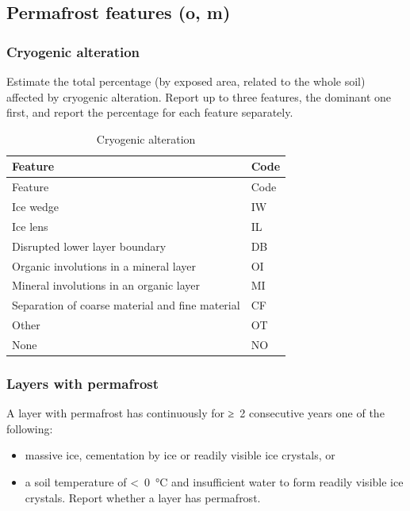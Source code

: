 \documentclass[
  letterpaper,
  DIV=11,
  numbers=noendperiod]{scrreprt}
\providecommand{\tightlist}{%
  \setlength{\itemsep}{0pt}\setlength{\parskip}{0pt}}\usepackage{longtable,booktabs,array}
\begin{document}
\hypertarget{permafrost-features-o-m}{%
\subsection{Permafrost features (o, m)}\label{permafrost-features-o-m}}

\hypertarget{cryogenic-alteration}{%
\subsubsection{Cryogenic alteration}\label{cryogenic-alteration}}

Estimate the total percentage (by exposed area, related to the whole
soil) affected by cryogenic alteration. Report up to three features, the
dominant one first, and report the percentage for each feature
separately.

\begin{longtable}[]{@{}ll@{}}
\caption{Cryogenic alteration}\tabularnewline
\toprule()
Feature & Code \\
\midrule()
\endfirsthead
\toprule()
Feature & Code \\
\midrule()
\endhead
Ice wedge & IW \\
Ice lens & IL \\
Disrupted lower layer boundary & DB \\
Organic involutions in a mineral layer & OI \\
Mineral involutions in an organic layer & MI \\
Separation of coarse material and fine material & CF \\
Other & OT \\
None & NO \\
\bottomrule()
\end{longtable}

\hypertarget{layers-with-permafrost}{%
\subsubsection{Layers with permafrost}\label{layers-with-permafrost}}

A layer with permafrost has continuously for ≥~2 consecutive years one
of the following:

\begin{itemize}
\tightlist
\item
  massive ice, cementation by ice or readily visible ice crystals, or
\item
  a soil temperature of \textless~0~°C and insufficient water to form
  readily visible ice crystals. Report whether a layer has permafrost.
\end{itemize}
\end{document}

